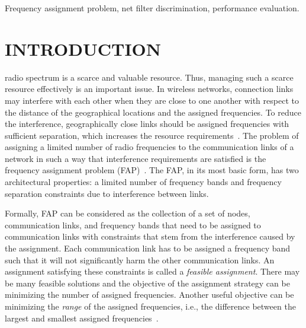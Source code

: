 \documentclass[10pt,twocolumn,twoside]{JCNtran}
\begin{document}
\begin{keywords}
Frequency assignment problem, net filter discrimination, performance evaluation.
\end{keywords}


\section{\uppercase{Introduction}}
\label{sec_introduction}
 radio spectrum is a scarce and valuable resource.  Thus, managing such a scarce resource effectively is an important issue. In wireless networks, connection links may interfere with each other when they are close to one another with respect to the distance of the geographical locations and the assigned frequencies. To reduce the interference, geographically close links should be assigned frequencies with sufficient separation, which increases the resource requirements~\cite{du2013handbookOC}. The problem of assigning a limited number of radio frequencies to the communication links of a network in such a way that interference requirements are satisfied is the frequency assignment problem (FAP)~\cite{pardalos2013nonlinearAP,mannino2003enumerativeAF,aardal1996branchAC,koster1998partialCS}. The FAP, in its most basic form, has two architectural properties: a limited number of frequency bands and frequency separation constraints due to interference between links.

Formally, FAP can be considered as the collection of a set of nodes, communication links, and frequency bands that need to be assigned to communication links with constraints that stem from the interference caused by the assignment. Each communication link has to be assigned a frequency band such that it will not significantly harm the other communication links. An assignment satisfying these constraints is called a \emph{feasible assignment}. There may be many feasible solutions and the objective of the assignment strategy can be minimizing the number of assigned frequencies. Another useful objective can be minimizing the \emph{range} of the assigned frequencies, i.e., the difference between the largest and smallest assigned frequencies~\cite{koster1998partialCS,flood2013fixedLF}.
\end{document}

